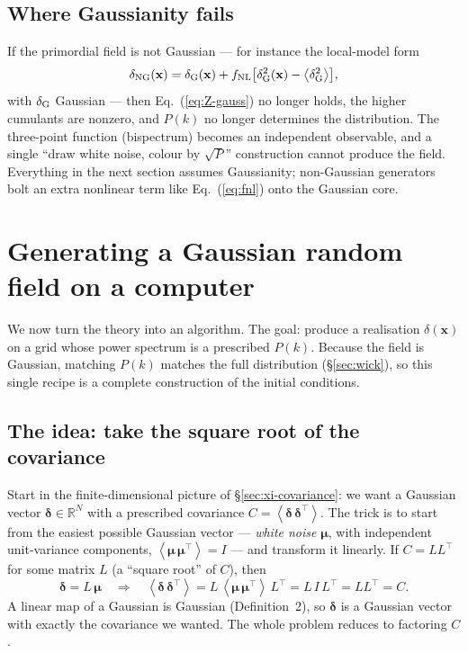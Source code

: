 \documentclass[12pt]{article}
\newcommand{\bx}{\mathbf{x}}
\newcommand{\avg}[1]{\left\langle #1 \right\rangle}
\begin{document}
\subsection{Where Gaussianity fails}
\label{sec:grf-fail}

If the primordial field is not Gaussian --- for instance the local-model
form
\begin{equation}
  \delta_{\rm NG}(\bx) = \delta_{\rm G}(\bx)
       + f_{\rm NL}\bigl[\delta_{\rm G}^2(\bx) - \avg{\delta_{\rm G}^2}\bigr],
  \label{eq:fnl}
\end{equation}
with $\delta_{\rm G}$ Gaussian --- then Eq.~(\ref{eq:Z-gauss}) no longer
holds, the higher cumulants are nonzero, and $P(k)$ no longer determines
the distribution.  The three-point function (bispectrum) becomes an
independent observable, and a single ``draw white noise, colour by
$\sqrt P$'' construction cannot produce the field.  Everything in the
next section assumes Gaussianity; non-Gaussian generators bolt an extra
nonlinear term like Eq.~(\ref{eq:fnl}) onto the Gaussian core.

\section{Generating a Gaussian random field on a computer}
\label{sec:generate}

We now turn the theory into an algorithm.  The goal: produce a realisation
$\delta(\bx)$ on a grid whose power spectrum is a prescribed $P(k)$.
Because the field is Gaussian, matching $P(k)$ matches the full
distribution (\S\ref{sec:wick}), so this single recipe is a complete
construction of the initial conditions.

\subsection{The idea: take the square root of the covariance}
\label{sec:gen-idea}

Start in the finite-dimensional picture of \S\ref{sec:xi-covariance}: we
want a Gaussian vector $\boldsymbol\delta \in \mathbb R^N$ with a
prescribed covariance $C = \avg{\boldsymbol\delta\,\boldsymbol\delta^\top}$.
The trick is to start from the easiest possible Gaussian vector ---
\emph{white noise} $\boldsymbol\mu$, with independent unit-variance
components, $\avg{\boldsymbol\mu\,\boldsymbol\mu^\top} = I$ --- and
transform it linearly.  If $C = LL^\top$ for some matrix $L$ (a ``square
root'' of $C$), then
\begin{equation}
  \boldsymbol\delta = L\,\boldsymbol\mu
  \quad\Longrightarrow\quad
  \avg{\boldsymbol\delta\,\boldsymbol\delta^\top}
     = L\,\avg{\boldsymbol\mu\,\boldsymbol\mu^\top}\,L^\top
     = L\,I\,L^\top = LL^\top = C.
  \label{eq:sqrt-cov}
\end{equation}
A linear map of a Gaussian is Gaussian (Definition~2), so
$\boldsymbol\delta$ is a Gaussian vector with exactly the covariance we
wanted.  The whole problem reduces to factoring $C$.
\end{document}

